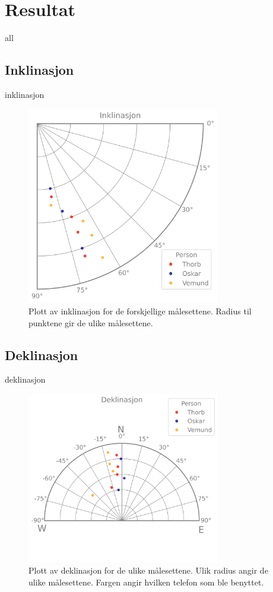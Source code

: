 \section{Resultat}

{all}

\subsection{Inklinasjon}

{inklinasjon}

\begin{figure}
    \centering
    \includegraphics[width=0.75\textwidth]{Plots/inclination.png}
    \caption{Plott av inklinasjon for de forskjellige målesettene. Radius til punktene gir de ulike målesettene.}
    
    \label{fig:plot_inklination}
\end{figure}


\subsection{Deklinasjon}

{deklinasjon}

\begin{figure}
    \centering
    \includegraphics[width=0.75\textwidth]{Plots/declination.png}
    \caption{Plott av deklinasjon for de ulike målesettene. Ulik radius angir de ulike målesettene. Fargen angir hvilken telefon som ble benyttet.}
    \label{fig:plot_declination}
\end{figure}
